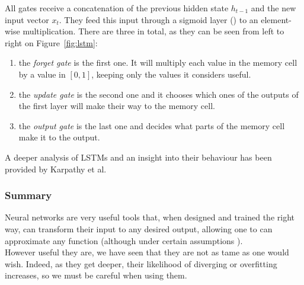 All gates receive a concatenation of the previous hidden
state $h_{t-1}$ and the new input vector $x_t$. They feed this input through a
sigmoid layer () to an element-wise multiplication. There are 
three in total, as they can be seen from left to right on Figure~\ref{fig:lstm}:
\begin{enumerate}
	\item the \textit{forget gate} is the first one. It will multiply each
		value in the memory cell by a value in $[0, 1]$, keeping only
		the values it considers useful.
	\item the \textit{update gate} is the second one and it chooses which
		ones of the outputs of the first  layer will
		make their way to the memory cell.
	\item the \textit{output gate} is the last one and decides what parts
		of the memory cell make it to the output.
\end{enumerate}
A deeper analysis of LSTMs and an insight into their behaviour has been
provided by Karpathy et al. \cite{lstm-analysis}

\subsubsection{Summary}
Neural networks are very useful tools that, when designed and trained the right way,
can transform their input to any desired output, allowing one to 
can approximate any function (although under certain assumptions
\cite{approx_theorem}).\\

However useful they are, we have seen that they are not as tame as one would
wish. Indeed, as they get deeper, their likelihood of diverging or
overfitting increases, so we must be careful when using them.
